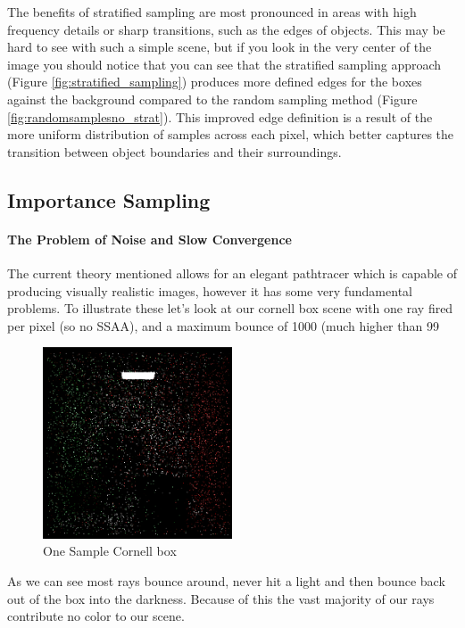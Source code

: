 \documentclass[12pt]{article}
\begin{document}
The benefits of stratified sampling are most pronounced in areas with high frequency details or sharp transitions, such as the edges of objects. This may be hard to see with such a simple scene, but if you look in the very center of the image you should notice that you can see that the stratified sampling approach (Figure \ref{fig:stratified_sampling}) produces more defined edges for the boxes against the background compared to the random sampling method (Figure \ref{fig:randomsamplesno_strat}). This improved edge definition is a result of the more uniform distribution of samples across each pixel, which better captures the transition between object boundaries and their surroundings.

\subsection{Importance Sampling}

\paragraph{The Problem of Noise and Slow Convergence} The current theory mentioned allows for an elegant pathtracer which is capable of producing visually realistic images, however it has some very fundamental problems. To illustrate these let's look at our cornell box scene with one ray fired per pixel (so no SSAA), and a maximum bounce of 1000 (much higher than 99%

\begin{figure}[H]
    \centering
    \includegraphics[width=0.5\textwidth]{images/random_one_sample_cornell.png}
    \caption{One Sample Cornell box}
    \label{fig:onesampcornell}
\end{figure}

As we can see most rays bounce around, never hit a light and then bounce back out of the box into the darkness. Because of this the vast majority of our rays contribute no color to our scene.
\end{document}
